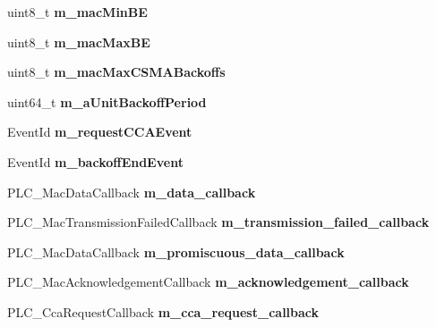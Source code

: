\begin{DoxyCompactItemize}
\item 
\hypertarget{classns3_1_1PLC__Mac_af838b2e81b22975e2d5ef6ed5c9c51fe}{uint8\-\_\-t {\bfseries m\-\_\-mac\-Min\-B\-E}}\label{classns3_1_1PLC__Mac_af838b2e81b22975e2d5ef6ed5c9c51fe}

\item 
\hypertarget{classns3_1_1PLC__Mac_af468edf28b12cca74ca95686e7be30b4}{uint8\-\_\-t {\bfseries m\-\_\-mac\-Max\-B\-E}}\label{classns3_1_1PLC__Mac_af468edf28b12cca74ca95686e7be30b4}

\item 
\hypertarget{classns3_1_1PLC__Mac_a426543cb44d6f20ff0e5d02b2ec56f3d}{uint8\-\_\-t {\bfseries m\-\_\-mac\-Max\-C\-S\-M\-A\-Backoffs}}\label{classns3_1_1PLC__Mac_a426543cb44d6f20ff0e5d02b2ec56f3d}

\item 
\hypertarget{classns3_1_1PLC__Mac_ae83250f3875668abca3605821cf52273}{uint64\-\_\-t {\bfseries m\-\_\-a\-Unit\-Backoff\-Period}}\label{classns3_1_1PLC__Mac_ae83250f3875668abca3605821cf52273}

\item 
\hypertarget{classns3_1_1PLC__Mac_a593500e52fdad245e78e6e5150f67813}{\-Event\-Id {\bfseries m\-\_\-request\-C\-C\-A\-Event}}\label{classns3_1_1PLC__Mac_a593500e52fdad245e78e6e5150f67813}

\item 
\hypertarget{classns3_1_1PLC__Mac_a7c278fc1000cccbe7bacf59c41df60b8}{\-Event\-Id {\bfseries m\-\_\-backoff\-End\-Event}}\label{classns3_1_1PLC__Mac_a7c278fc1000cccbe7bacf59c41df60b8}

\item 
\hypertarget{classns3_1_1PLC__Mac_a28406aa33e1606a6eac7f3ea26d88dad}{\-P\-L\-C\-\_\-\-Mac\-Data\-Callback {\bfseries m\-\_\-data\-\_\-callback}}\label{classns3_1_1PLC__Mac_a28406aa33e1606a6eac7f3ea26d88dad}

\item 
\hypertarget{classns3_1_1PLC__Mac_a064a0a0421abcc3c7296bec2336561d7}{\-P\-L\-C\-\_\-\-Mac\-Transmission\-Failed\-Callback {\bfseries m\-\_\-transmission\-\_\-failed\-\_\-callback}}\label{classns3_1_1PLC__Mac_a064a0a0421abcc3c7296bec2336561d7}

\item 
\hypertarget{classns3_1_1PLC__Mac_a3275f60b38b8a35f4e87653939e68eab}{\-P\-L\-C\-\_\-\-Mac\-Data\-Callback {\bfseries m\-\_\-promiscuous\-\_\-data\-\_\-callback}}\label{classns3_1_1PLC__Mac_a3275f60b38b8a35f4e87653939e68eab}

\item 
\hypertarget{classns3_1_1PLC__Mac_a1b435771a36fe2133a8930b03011e0ae}{\-P\-L\-C\-\_\-\-Mac\-Acknowledgement\-Callback {\bfseries m\-\_\-acknowledgement\-\_\-callback}}\label{classns3_1_1PLC__Mac_a1b435771a36fe2133a8930b03011e0ae}

\item 
\hypertarget{classns3_1_1PLC__Mac_ac8a358c85a1a77cb882bfc065daaca37}{\-P\-L\-C\-\_\-\-Cca\-Request\-Callback {\bfseries m\-\_\-cca\-\_\-request\-\_\-callback}}\label{classns3_1_1PLC__Mac_ac8a358c85a1a77cb882bfc065daaca37}

\end{DoxyCompactItemize}
